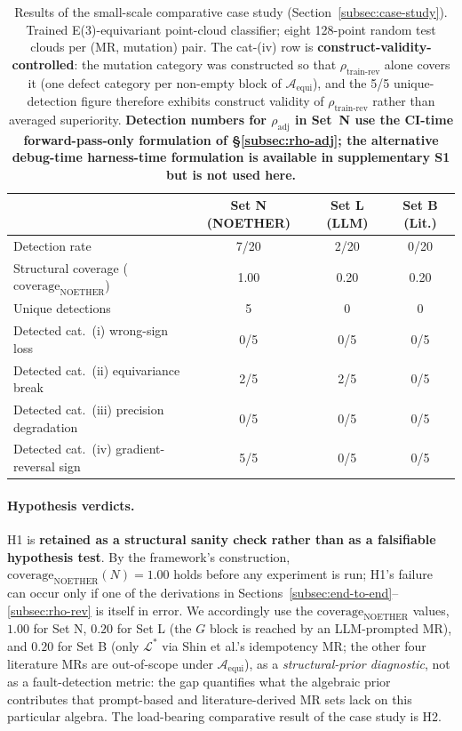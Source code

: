 \documentclass[manuscript]{acmart}
\begin{document}
\begin{table}[h]
\centering
\caption{Results of the small-scale comparative case study (Section~\ref{subsec:case-study}). Trained E(3)-equivariant point-cloud classifier; eight 128-point random test clouds per (MR, mutation) pair. The cat-(iv) row is \textbf{construct-validity-controlled}: the mutation category was constructed so that $\rho_{\mathrm{train\text{-}rev}}$ alone covers it (one defect category per non-empty block of $\mathcal{A}_{\mathrm{equi}}$), and the 5/5 unique-detection figure therefore exhibits construct validity of $\rho_{\mathrm{train\text{-}rev}}$ rather than averaged superiority. \textbf{Detection numbers for $\rho_{\mathrm{adj}}$ in Set~N use the CI-time forward-pass-only formulation of \S\ref{subsec:rho-adj}; the alternative debug-time harness-time formulation is available in supplementary S1 but is not used here.}}
\label{tab:case-study}
\small
\begin{tabular}{lccc}
\toprule
& Set N (NOETHER) & Set L (LLM) & Set B (Lit.) \\
\midrule
Detection rate & 7/20 & 2/20 & 0/20 \\
Structural coverage ($\mathrm{coverage}_{\mathrm{NOETHER}}$) & 1.00 & 0.20 & 0.20 \\
Unique detections & 5 & 0 & 0 \\
Detected cat.~(i) wrong-sign loss & 0/5 & 0/5 & 0/5 \\
Detected cat.~(ii) equivariance break & 2/5 & 2/5 & 0/5 \\
Detected cat.~(iii) precision degradation & 0/5 & 0/5 & 0/5 \\
Detected cat.~(iv) gradient-reversal sign & 5/5 & 0/5 & 0/5 \\
\bottomrule
\end{tabular}
\end{table}

\paragraph{Hypothesis verdicts.}
H1 is \textbf{retained as a structural sanity check rather than as a falsifiable hypothesis test}. By the framework's construction, $\mathrm{coverage}_{\mathrm{NOETHER}}(N) = 1.00$ holds before any experiment is run; H1's failure can occur only if one of the derivations in Sections~\ref{subsec:end-to-end}--\ref{subsec:rho-rev} is itself in error. We accordingly use the $\mathrm{coverage}_{\mathrm{NOETHER}}$ values, $1.00$ for Set N, $0.20$ for Set L (the $G$ block is reached by an LLM-prompted MR), and $0.20$ for Set B (only $\mathcal{L}^*$ via Shin et al.'s idempotency MR; the other four literature MRs are out-of-scope under $\mathcal{A}_{\mathrm{equi}}$), as a \emph{structural-prior diagnostic}, not as a fault-detection metric: the gap quantifies what the algebraic prior contributes that prompt-based and literature-derived MR sets lack on this particular algebra. The load-bearing comparative result of the case study is H2.
\end{document}
